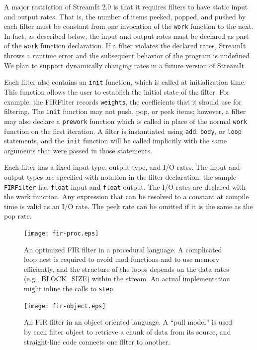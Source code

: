 A major restriction of StreamIt 2.0 is that it requires filters to
have static input and output rates.  That is, the number of items
peeked, popped, and pushed by each filter must be constant from one
invocation of the \texttt{work} function to the next.  In fact, as
described below, the input and output rates must be declared as part
of the \texttt{work} function declaration.  If a filter violates the
declared rates, StreamIt throws a runtime error and the subsequent
behavior of the program is undefined. We plan to support dynamically
changing rates in a future version of StreamIt.

Each filter also contains an \texttt{init} function, which is called
at initialization time.  This function allows the user to establish
the initial state of the filter.  For example, the FIRFilter records
\texttt{weights}, the coefficients that it should use for filtering.
The \texttt{init} function may not push, pop, or peek items; however,
a filter may also declare a \texttt{prework} function which is called
in place of the normal \texttt{work} function on the first iteration.
A filter is instantiated using \texttt{add}, \texttt{body}, or
\texttt{loop} statements, and the \texttt{init} function will be
called implicitly with the same arguments that were passed in those
statements.

Each filter has a fixed input type, output type, and I/O rates.  The
input and output types are specified with notation in the filter
declaration; the sample \texttt{FIRFilter} has \texttt{float} input
and \texttt{float} output.  The I/O rates are declared with the work
function.  Any expression that can be resolved to a constant at
compile time is valid as an I/O rate.  The peek rate can be omitted if
it is the same as the pop rate.

\begin{figure}
\centering
\texttt{[image: fir-proc.eps]}
\caption{An optimized FIR filter in a procedural language.  A
  complicated loop nest is required to avoid mod functions and to use
  memory efficiently, and the structure of the loops depends on the
  data rates (e.g., BLOCK\_SIZE) within the stream.  An actual
  implementation might inline the calls to \texttt{step}.}
\label{fig:firprocedural}
\end{figure}

\begin{figure}
\centering
\texttt{[image: fir-object.eps]}
\caption{An FIR filter in an object oriented language.  A ``pull
  model'' is used by each filter object to retrieve a chunk of data
  from its source, and straight-line code connects one filter to
  another.}
\label{fig:firobject}
\end{figure}

